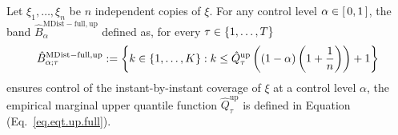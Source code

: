 \documentclass[11pt]{article}
\begin{document}
\begin{proposition}
\label{prop.ibib.mdist.up.full}
Let $\xi_1, \ldots, \xi_n$ be $n$ independent copies of $\xi$.
%
%
%
For any control level $\alpha \in \left[\, 0, 1 \,\right]$,
the band $\hat{B}^{\mathrm{MDist-full, up}}_{\alpha}$ defined as,
for every $\tau \in \left\{ 1, \ldots, T \right\}$
\begin{align}
\label{eq.ibib.mdist.up.full}
    \hat{B}_{\alpha; \tau}^{\mathrm{MDist-full, up}} := \left\{ 
        k \in \left\{ 1, \ldots, K \right\} :
        k \leq \hat{Q}_{\tau}^{\mathrm{up}} \left( \left( 1 - \alpha \right) \left( 1 + \frac{1}{n} \right) \right) + 1
     \right\}
\end{align}
ensures control of the instant-by-instant coverage of $\xi$ at a control level $\alpha$,
the empirical marginal upper quantile function $\hat{Q}^{\mathrm{up}}_{\tau}$ is defined in Equation (Eq.~\eqref{eq.eqt.up.full}).
\end{proposition}
%
%
%
\end{document}
